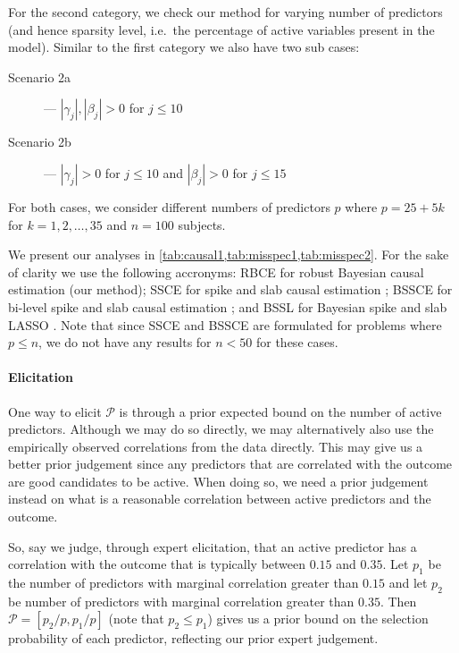 \documentclass[preprint,12pt]{elsarticle}
\begin{document}
For the second category, we check our method for varying number of predictors 
(and hence sparsity level, i.e.\ the percentage of active variables present in the model).
Similar to the first category we also have two sub cases:
\begin{description}
    \item[Scenario 2a] --- $|\gamma_j|, |\beta_j|>0$ for $j\le 10$
    \item[Scenario 2b] --- $|\gamma_j|>0$ for $j\le 10$ and $|\beta_j|>0$ for $j\le 15$
\end{description}
For both
cases, we consider different numbers of predictors $p$ where
$p=25+ 5k$ for $k=1,2,\dots,35$ and $n=100$
subjects.

We present our analyses in \cref{tab:causal1,tab:misspec1,tab:misspec2}.
For the sake of clarity we use the following accronyms: RBCE for 
robust Bayesian causal estimation (our method); SSCE for spike and
slab causal estimation \citep{koch2020}; BSSCE for bi-level spike and slab causal
estimation \citep{koch2020}; and BSSL for Bayesian spike and slab LASSO
\citep{xu2015}. Note that since SSCE and BSSCE are formulated for problems
where $p\le n$, we do not have any results for $n<50$ for these cases.

\paragraph{Elicitation}
One way to elicit $\mathcal{P}$
is through a prior expected bound on the number of active predictors.
Although we may do so directly,
we may alternatively also use the empirically observed correlations from the data directly.
This may give us a better prior judgement since any predictors that are correlated with the outcome are good candidates to be active.
When doing so, we need a prior judgement instead on what is a reasonable correlation between active predictors and the outcome.

So, say we judge, through expert elicitation, that
an active predictor has a correlation with the outcome
that is typically between $0.15$ and $0.35$.
Let $p_1$ be the number of predictors with marginal correlation greater than $0.15$
and let $p_2$ be number of predictors with marginal 
correlation greater than $0.35$.
Then $\mathcal{P}=[p_2/p , p_1/p]$ (note that $p_2\le p_1$) gives us a prior bound on the selection probability of each predictor, reflecting our prior expert judgement.
\end{document}
